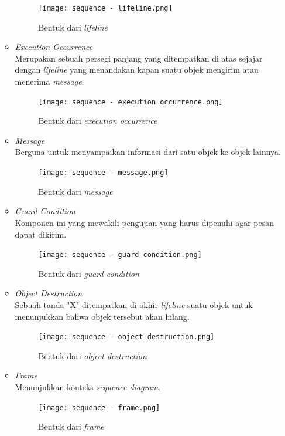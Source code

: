 \documentclass[a4paper]{article}
\begin{document}
\begin{enumerate}
\begin{itemize}
        \begin{figure}[h]
            \centering
            \texttt{[image: sequence - lifeline.png]}
            \caption{Bentuk dari \textit{lifeline}}
        \end{figure}
        \item \textit{Execution Occurrence}\\
        Merupakan sebuah persegi panjang yang ditempatkan di atas sejajar dengan \textit{lifeline} yang menandakan kapan suatu objek mengirim atau menerima \textit{message}\autocite{systemanalysisdesign-sequence-diagram}.
        \begin{figure}[h]
            \centering
            \texttt{[image: sequence - execution occurrence.png]}
            \caption{Bentuk dari \textit{execution occurrence}}
        \end{figure}
        \item \textit{Message}\\
        Berguna untuk menyampaikan informasi dari satu objek ke objek lainnya\autocite{systemanalysisdesign-sequence-diagram}.
        \begin{figure}[h]
            \centering
            \texttt{[image: sequence - message.png]}
            \caption{Bentuk dari \textit{message}}
        \end{figure}
        \item \textit{Guard Condition}\\
        Komponen ini yang mewakili pengujian yang harus dipenuhi agar pesan dapat dikirim\autocite{systemanalysisdesign-sequence-diagram}.
        \begin{figure}[h]
            \centering
            \texttt{[image: sequence - guard condition.png]}
            \caption{Bentuk dari \textit{guard condition}}
        \end{figure}
        \newpage
        \item \textit{Object Destruction}\\
        Sebuah tanda "X" ditempatkan di akhir \textit{lifeline} suatu objek untuk menunjukkan bahwa objek tersebut akan hilang\autocite{systemanalysisdesign-sequence-diagram}.
        \begin{figure}[h]
            \centering
            \texttt{[image: sequence - object destruction.png]}
            \caption{Bentuk dari \textit{object destruction}}
        \end{figure}
        \item \textit{Frame}\\
        Menunjukkan konteks \textit{sequence diagram}\autocite{systemanalysisdesign-sequence-diagram}.
        \begin{figure}[h]
            \centering
            \texttt{[image: sequence - frame.png]}
            \caption{Bentuk dari \textit{frame}}
        \end{figure}
    \end{itemize}
\end{enumerate}
\end{document}
